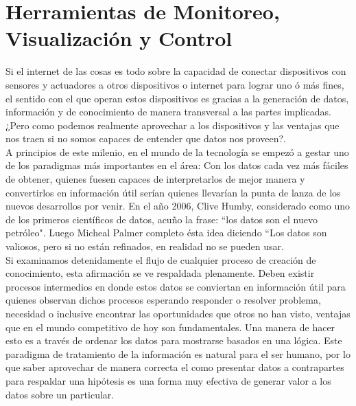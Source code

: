 

\chapter{Herramientas de Monitoreo, Visualización y Control}
Si el internet de las cosas es todo sobre la capacidad de conectar dispositivos con sensores y actuadores a otros dispositivos o internet para lograr uno ó más fines, el sentido con el que operan estos dispositivos es gracias a la generación de datos, información y de conocimiento de manera transversal a las partes implicadas. ¿Pero como podemos realmente aprovechar a los dispositivos y las ventajas que nos traen si no somos capaces de entender que datos nos proveen?.\\

A principios de este milenio, en el mundo de la tecnología se empezó a gestar uno de los paradigmas más importantes en el área: Con los datos cada vez más fáciles de obtener, quienes fuesen capaces de interpretarlos de mejor manera y convertirlos en información útil serían quienes llevarían la punta de lanza de los nuevos desarrollos por venir. En el año 2006, Clive Humby, considerado como uno de los primeros científicos de datos, acuño la frase: ``los datos son el nuevo petróleo". Luego Micheal Palmer completo ésta idea diciendo ``Los datos son  valiosos, pero si no están refinados, en realidad no se pueden usar\cite{datosPetroleo}.\\

Si examinamos detenidamente el flujo de cualquier proceso de creación de conocimiento, esta afirmación se ve respaldada plenamente. Deben existir procesos intermedios en donde estos datos se conviertan en información útil para quienes observan dichos procesos esperando responder o resolver problema, necesidad o inclusive encontrar las oportunidades que otros no han visto, ventajas que en el mundo competitivo de hoy son fundamentales. Una manera de hacer esto es a través de ordenar los datos para mostrarse basados en una lógica. Este paradigma de tratamiento de la información es natural para el ser humano, por lo que saber aprovechar de manera correcta el como presentar datos a contrapartes para respaldar una hipótesis es una forma muy efectiva de generar valor a los datos sobre un particular.\\

